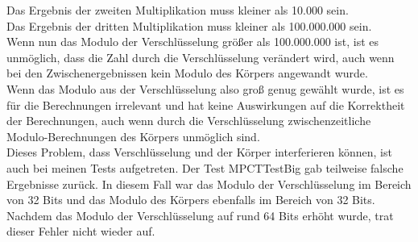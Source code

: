 Das Ergebnis der zweiten Multiplikation muss kleiner als 10.000 sein.\\
Das Ergebnis der dritten Multiplikation muss kleiner als 100.000.000 sein.\\
Wenn nun das Modulo der Verschlüsselung größer als 100.000.000 ist, ist es unmöglich, dass die Zahl durch die Verschlüsselung verändert wird, auch wenn bei den Zwischenergebnissen kein Modulo des Körpers angewandt wurde.\\
Wenn das Modulo aus der Verschlüsselung also groß genug gewählt wurde, ist es für die Berechnungen irrelevant und hat keine Auswirkungen auf die Korrektheit der Berechnungen, auch wenn durch die Verschlüsselung zwischenzeitliche Modulo-Berechnungen des Körpers unmöglich sind.\\
Dieses Problem, dass Verschlüsselung und der Körper interferieren können, ist auch bei meinen Tests aufgetreten. Der Test MPCTTestBig gab teilweise falsche Ergebnisse zurück. In diesem Fall war das Modulo der Verschlüsselung im Bereich von 32 Bits und das Modulo des Körpers ebenfalls im Bereich von 32 Bits. Nachdem das Modulo der Verschlüsselung auf rund 64 Bits erhöht wurde, trat dieser Fehler nicht wieder auf.\\